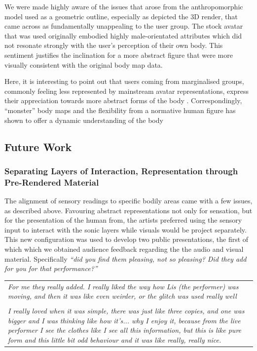 We were made highly aware of the issues that arose from the anthropomorphic model used as a geometric outline, especially as depicted the 3D render, that came across as fundamentally unappealing to the user group. The stock avatar that was used originally embodied highly male-orientated attributes which did not resonate strongly with the user's perception of their own body. This sentiment justifies the inclination for a more abstract figure that were more visually consistent with the original body map data.

Here, it is interesting to point out that users coming from marginalised groups, commonly feeling less represented by mainstream avatar representations, express their appreciation towards more abstract forms of the body \cite{niehaus_making_2021}. Correspondingly, ``monster'' body maps and the flexibility from a normative human figure has shown to offer a dynamic understanding of the body \cite{hook_soma_2019}

\subsection{Future Work}

\subsubsection{Separating Layers of Interaction, Representation through Pre-Rendered Material}

The alignment of sensory readings to specific bodily areas came with a few issues, as described above. Favouring abstract representations not only for sensation, but for the presentation of the human from, the artists preferred using the sensory input to interact with the sonic layers while visuals would be project separately. This new configuration was used to develop two public presentations, the first of which which we obtained audience feedback regarding the the audio and visual material. Specifically \textit{``did you find them pleasing, not so pleasing? Did they add for you for that performance?''}

\begin{center}
\begin{tabular}{ p{13cm}}
\textit{For me they really added. I really liked the way how Lis (the performer) was moving, and then it was like even weirder, or the glitch was used really well} \\
\\
\textit{I really loved when it was simple, there was just like three copies, and one was bigger and I was thinking like how it's... why I enjoy it, because from the live performer I see the clothes like I see all this information, but this is like pure form and this little bit odd behaviour and it was like really, really nice.}
\end{tabular}
\end{center}

